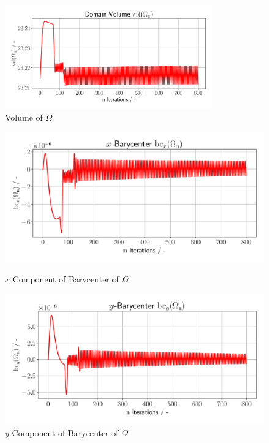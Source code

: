 \pagebreak
\begin{figure}
    \begin{center}
        \includegraphics[width=0.8\textwidth]{figures/volume_plot.pdf}
        \caption{Volume of $\Omega$}
        \label{plot_ref_volume}
    \end{center}
\end{figure}
\begin{figure}
    \begin{minipage}{.5\textwidth}
        \centering
        \includegraphics[width=1\textwidth]{figures/bc_x__plot.pdf}
        \caption{$x$ Component of Barycenter of $\Omega$}
        \label{plot_ref_bc_x}
    \end{minipage}
    \begin{minipage}{.5\textwidth}
        \centering
        \includegraphics[width=1\textwidth]{figures/bc_y_plot.pdf}
        \caption{$y$ Component of Barycenter of $\Omega$}
        \label{plot_ref_bc_y}
    \end{minipage}
    \end{figure}

